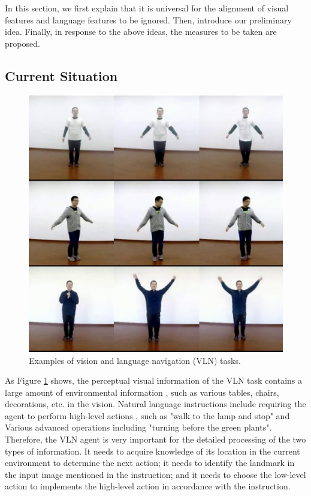 In this section, we first explain that it is universal for the alignment of visual features and language features to be ignored. Then, introduce our preliminary idea. Finally, in response to the above ideas, the measures to be taken are proposed.
\vspace{-1em}
\subsection{Current Situation}	
\vspace{-1em}
\begin{figure}[h]
	\vspace{-2em}
	\centering
	\includegraphics[scale=1]{image01.png}
	\caption{Examples of vision and language navigation (VLN) tasks.}
	\label{image01}
\end{figure}
\vspace{-1em}
As Figure \ref{image01} shows, the perceptual visual information of the VLN task contains a large amount of environmental information \cite{huang2019transferable}, such as various tables, chairs, decorations, etc. in the vision. Natural language instructions include requiring the agent to perform high-level actions \cite{majumdar2020improving}, such as "walk to the lamp and stop" and Various advanced operations including "turning before the green plants". Therefore, the VLN agent is very important for the detailed processing of the two types of information. It needs to acquire knowledge of its location in the current environment to determine the next action; it needs to identify the landmark in the input image mentioned in the instruction; and it needs to choose the low-level action to implements the high-level action in accordance with the instruction.

